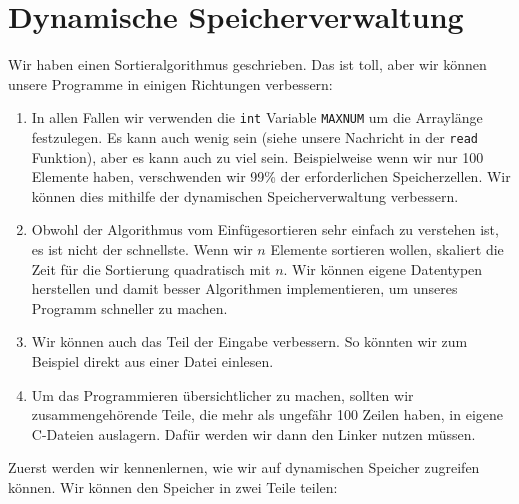 \section{Dynamische Speicherverwaltung}

Wir haben einen Sortieralgorithmus geschrieben. Das ist toll, aber wir können
unsere Programme in einigen Richtungen verbessern:

\begin{enumerate}
    \item
        In allen Fallen wir verwenden die \texttt{int} Variable \texttt{MAXNUM}
        um die Arraylänge festzulegen. Es kann auch wenig sein (siehe unsere
        Nachricht in der \texttt{read} Funktion), aber es kann auch zu viel
        sein. Beispielweise wenn wir nur 100 Elemente haben, verschwenden wir
        99\% der erforderlichen Speicherzellen. Wir können dies mithilfe der
        dynamischen Speicherverwaltung verbessern.
    \item
        Obwohl der Algorithmus vom Einfügesortieren sehr einfach zu verstehen
        ist, es ist nicht der schnellste. Wenn wir $n$ Elemente sortieren
        wollen, skaliert die Zeit für die Sortierung quadratisch mit $n$. Wir
        können eigene Datentypen herstellen und damit besser Algorithmen
        implementieren, um unseres Programm schneller zu machen.

    \item
        Wir können auch das Teil der Eingabe verbessern. So könnten wir zum
        Beispiel direkt aus einer Datei einlesen.

    \item
        Um das Programmieren übersichtlicher zu machen, sollten wir
        zusammengehörende Teile, die mehr als ungefähr 100 Zeilen haben, in
        eigene C-Dateien auslagern. Dafür werden wir dann den Linker nutzen
        müssen.
\end{enumerate}

Zuerst werden wir kennenlernen, wie wir auf dynamischen Speicher zugreifen
können. Wir können den Speicher in zwei Teile teilen:

